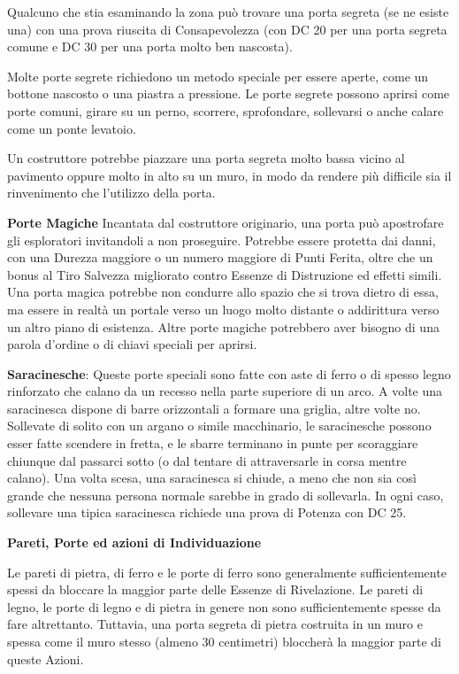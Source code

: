 \documentclass[a4paper,11pt,twoside,openany]{book}
\begin{document}
Qualcuno che stia esaminando la zona può trovare una porta segreta (se ne esiste una) con una prova riuscita di Consapevolezza (con DC 20 per una porta segreta comune e DC 30 per una porta molto ben nascosta).

Molte porte segrete richiedono un metodo speciale per essere aperte, come un bottone nascosto o una piastra a pressione. Le porte segrete possono aprirsi come porte comuni, girare su un perno, scorrere, sprofondare, sollevarsi o anche calare come un ponte levatoio.

Un costruttore potrebbe piazzare una porta segreta molto bassa vicino al pavimento oppure molto in alto su un muro, in modo da rendere più difficile sia il rinvenimento che l'utilizzo della porta.

\textbf{Porte Magiche} Incantata dal costruttore originario, una porta può apostrofare gli esploratori invitandoli a non proseguire. Potrebbe essere protetta dai danni, con una Durezza maggiore o un numero maggiore di Punti Ferita, oltre che un bonus al Tiro Salvezza migliorato contro Essenze di Distruzione ed effetti simili. Una porta magica potrebbe non condurre allo spazio che si trova dietro di essa, ma essere in realtà un portale verso un luogo molto distante o addirittura verso un altro piano di esistenza. Altre porte magiche potrebbero aver bisogno di una parola d'ordine o di chiavi speciali per aprirsi.

\textbf{Saracinesche}: Queste porte speciali sono fatte con aste di ferro o di spesso legno rinforzato che calano da un recesso nella parte superiore di un arco. A volte una saracinesca dispone di barre orizzontali a formare una griglia, altre volte no. Sollevate di solito con un argano o simile macchinario, le saracinesche possono esser fatte scendere in fretta, e le sbarre terminano in punte per scoraggiare chiunque dal passarci sotto (o dal tentare di attraversarle in corsa mentre calano). Una volta scesa, una saracinesca si chiude, a meno che non sia così grande che nessuna persona normale sarebbe in grado di sollevarla. In ogni caso, sollevare una tipica saracinesca richiede una prova di Potenza con DC 25.

\textbf{Pareti, Porte ed azioni di Individuazione}

Le pareti di pietra, di ferro e le porte di ferro sono generalmente sufficientemente spessi da bloccare la maggior parte delle Essenze di Rivelazione. Le pareti di legno, le porte di legno e di pietra in genere non sono sufficientemente spesse da fare altrettanto. Tuttavia, una porta segreta di pietra costruita in un muro e spessa come il muro stesso (almeno 30 centimetri) bloccherà la maggior parte di queste Azioni.
\end{document}
